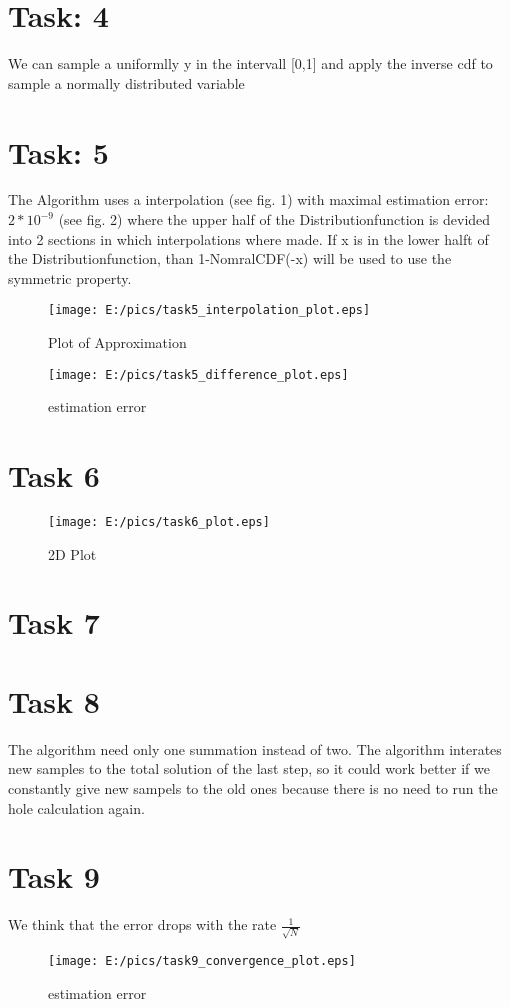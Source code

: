\documentclass{article}
\begin{document}
\section{Task: 4} %
We can sample a uniformlly y in the intervall [0,1] and apply the inverse cdf to sample a normally distributed variable

\newpage
\section{Task: 5} %
The Algorithm uses a interpolation (see fig. 1) with maximal estimation error: $2*10^{-9}$ (see fig. 2) where the upper half of the Distributionfunction is devided into 2 sections in which interpolations where made. 
If x is in the lower halft of the Distributionfunction, than 1-NomralCDF(-x) will be used to use the symmetric property.
\begin{figure}[htbp]
	\centering
		\texttt{[image: E:/pics/task5\_interpolation\_plot.eps]}
		\caption{Plot of Approximation}
	\label{fig:task5_interpolation_plot}
\end{figure}
\begin{figure}[htbp]
	\centering
		\texttt{[image: E:/pics/task5\_difference\_plot.eps]}
	\caption{estimation error}
	\label{fig:task5_difference_plot}
\end{figure}

\newpage
\section{Task 6}
\begin{figure}[htbp]
	\centering
		\texttt{[image: E:/pics/task6\_plot.eps]}
	\caption{2D Plot}
	\label{fig:task6_plot}
\end{figure}

\section{Task 7}

\section{Task 8}
The algorithm need only one summation instead of two. The algorithm interates new samples to the total solution of the last step, so it could work better if we constantly give new sampels to the old ones because there is no need to run the hole calculation again. 

\section{Task 9}
We think that the error drops with the rate $\frac{1}{\sqrt{N}}$
\begin{figure}[htbp]
	\centering
		\texttt{[image: E:/pics/task9\_convergence\_plot.eps]}
	\caption{estimation error}
	\label{fig:task9_convergence_plot}
\end{figure}
\end{document}
